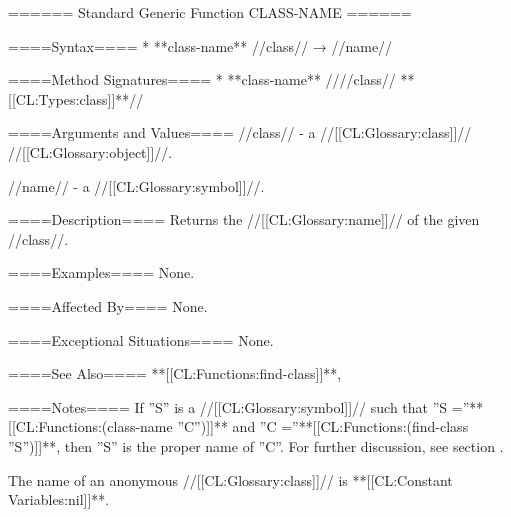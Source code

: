 ====== Standard Generic Function CLASS-NAME ======

====Syntax====
  * **class-name** //class// → //name//

====Method Signatures====
  * **class-name** ////class// **[[CL:Types:class]]**//

====Arguments and Values====
//class// - a //[[CL:Glossary:class]]// //[[CL:Glossary:object]]//.

//name// - a //[[CL:Glossary:symbol]]//.

====Description====
Returns the //[[CL:Glossary:name]]// of the given //class//.

====Examples====
None.

====Affected By====
None.

====Exceptional Situations====
None.

====See Also====
**[[CL:Functions:find-class]]**, {\secref\Classes}

====Notes====
If ''S'' is a //[[CL:Glossary:symbol]]// such that ''S =''**[[CL:Functions:(class-name ''C'')]]** and ''C =''**[[CL:Functions:(find-class ''S'')]]**, then ''S'' is the proper name of ''C''. For further discussion, see section {\secref\Classes}.

The name of an anonymous //[[CL:Glossary:class]]// is **[[CL:Constant Variables:nil]]**.

